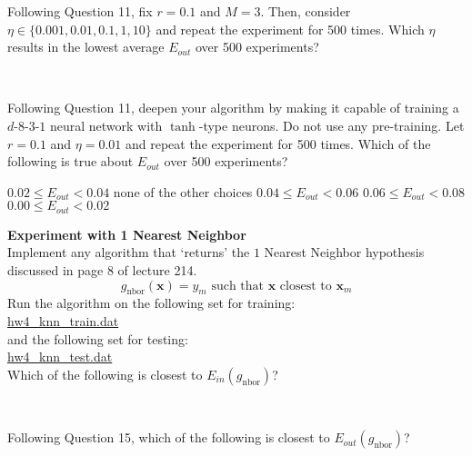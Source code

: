 \documentclass[a4paper,10pt]{exam}
\begin{document}
\begin{questions}
	   \question Following Question 11, fix $r=0.1$ and $M=3$. Then, consider $\eta \in \{0.001, 0.01, 0.1, 1, 10\}$ and repeat the experiment for 500 times. Which $\eta$ results in the lowest average $E_{out}$ over 500 experiments?
	   \begin{checkboxes}
	   	\\
	   \end{checkboxes}
	   
	   \question Following Question 11, deepen your algorithm by making it capable of training a $d$-$8$-$3$-$1$ neural network with $\tanh$-type neurons. Do not use any pre-training. Let $r=0.1$ and $\eta = 0.01$ and repeat the experiment for 500 times. Which of the following is true about $E_{out}$ over 500 experiments?
	   \begin{checkboxes}
	   	\CorrectChoice $0.02 \leq E_{out} < 0.04$
	   	\choice none of the other choices
	   	\choice $0.04 \leq E_{out} < 0.06$
	   	\choice $0.06 \leq E_{out} < 0.08$
	   	\choice $0.00 \leq E_{out} < 0.02$\\ 
	   \end{checkboxes}
	   
	   \question \textbf{Experiment with 1 Nearest Neighbor}\\
	   Implement any algorithm that `returns' the $1$ Nearest Neighbor hypothesis discussed in page 8 of lecture 214. 
	   \[g_{\text{nbor}}(\mathbf{x}) = y_m \mbox{ such that } \mathbf{x} \mbox{ closest to } \mathbf{x}_m\]
	   Run the algorithm on the following set for training:\\
	   \href{https://d396qusza40orc.cloudfront.net/ntumltwo/hw4_data/hw4_knn_train.dat}{hw4\_knn\_train.dat}\\
	   and the following set for testing:\\
	   \href{https://d396qusza40orc.cloudfront.net/ntumltwo/hw4_data/hw4_knn_test.dat}{hw4\_knn\_test.dat}
	   \\Which of the following is closest to $E_{in}(g_{\text{nbor}})$?
	   \begin{checkboxes}
	   	\choice 0.2
	   	\choice 0.3
	   	\CorrectChoice 0.0
	   	\choice 0.1
	   	\\
	   \end{checkboxes}
	   
	   \question Following Question 15, which of the following is closest to $E_{out}(g_{\text{nbor}})$?
	   \begin{checkboxes}
	   	\choice 0.30
	   	8
	   	\CorrectChoice 0.34
	   	2
	   	\\
	   \end{checkboxes}
	   

\end{questions}
\end{document}
